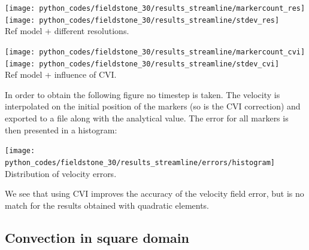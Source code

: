 \begin{center}
\texttt{[image: python\_codes/fieldstone\_30/results\_streamline/markercount\_res]}
\texttt{[image: python\_codes/fieldstone\_30/results\_streamline/stdev\_res]}\\
{\captionfont Ref model + different resolutions.}
\end{center}

\begin{center}
\texttt{[image: python\_codes/fieldstone\_30/results\_streamline/markercount\_cvi]}
\texttt{[image: python\_codes/fieldstone\_30/results\_streamline/stdev\_cvi]}\\
{\captionfont Ref model + influence of CVI.}
\end{center}


In order to obtain the following figure no timestep is taken. The velocity is interpolated on 
the initial position of the markers (so is the CVI correction) and exported to a file along with 
the analytical value. The error for all markers is then presented in a histogram:
\begin{center}
\texttt{[image: python\_codes/fieldstone\_30/results\_streamline/errors/histogram]}\\
{\captionfont Distribution of velocity errors.}
\end{center}
We see that using CVI improves the accuracy of the velocity field error, but is no match for 
the results obtained with quadratic elements.

\newpage
\subsection*{Convection in square domain}

